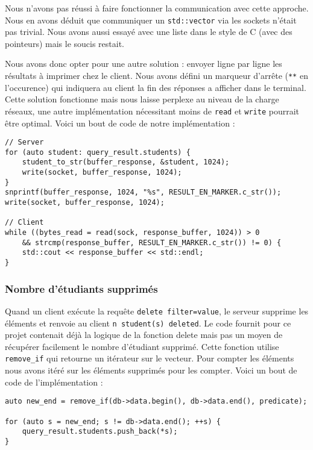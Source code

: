 \documentclass[utf8]{article}
\begin{document}
	Nous n'avons pas réussi à faire fonctionner la communication avec cette approche. Nous en avons déduit que communiquer un \texttt{std::vector} via les sockets n'était pas trivial. Nous avons aussi essayé avec une liste dans le style de C (avec des pointeurs) mais le soucis restait.
	
	Nous avons donc opter pour une autre solution : envoyer ligne par ligne les résultats à imprimer chez le client. Nous avons défini un marqueur d'arrête (\texttt{**} en l'occurence) qui indiquera au client la fin des réponses a afficher dans le terminal. Cette solution fonctionne mais nous laisse perplexe au niveau de la charge réseaux, une autre implémentation nécessitant moins de \texttt{read} et \texttt{write} pourrait être optimal. Voici un bout de code de notre implémentation :

\begin{lstlisting}
// Server
for (auto student: query_result.students) {
	student_to_str(buffer_response, &student, 1024);
	write(socket, buffer_response, 1024);
}
snprintf(buffer_response, 1024, "%s", RESULT_EN_MARKER.c_str());
write(socket, buffer_response, 1024);

// Client 
while ((bytes_read = read(sock, response_buffer, 1024)) > 0
	&& strcmp(response_buffer, RESULT_EN_MARKER.c_str()) != 0) {
	std::cout << response_buffer << std::endl;
}
\end{lstlisting}

\subsubsection{Nombre d'étudiants supprimés}

Quand un client exécute la requête \texttt{delete filter=value}, le serveur supprime les éléments et renvoie au client \texttt{n student(s) deleted}. Le code fournit pour ce projet contenait déjà la logique de la fonction delete mais pas un moyen de récupérer facilement le nombre d'étudiant supprimé. Cette fonction utilise \texttt{remove\_if} qui retourne un itérateur sur le vecteur. Pour compter les éléments nous avons itéré sur les éléments supprimés pour les compter. Voici un bout de code de l'implémentation :

\begin{lstlisting}
auto new_end = remove_if(db->data.begin(), db->data.end(), predicate);

for (auto s = new_end; s != db->data.end(); ++s) {
	query_result.students.push_back(*s);
}
\end{lstlisting}
\end{document}
